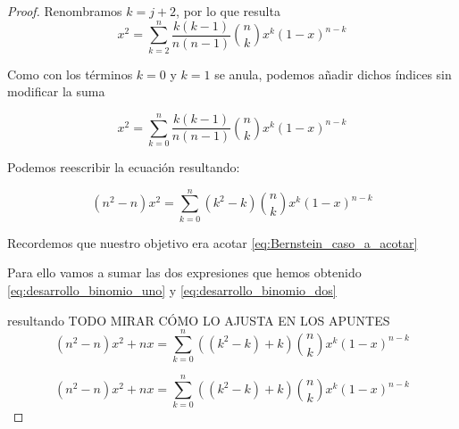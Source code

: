 \begin{proof}
    Renombramos $k= j+2$, por lo que resulta
    \begin{equation}
        x^2 = \sum_{k=2}^{n} \frac{k(k-1)}{n(n-1)} \binom{n}{k} x^{k} (1-x)^{n-k}
    \end{equation}

    Como con los términos $k=0$ y $k=1$ se anula, podemos añadir dichos índices sin modificar la suma 
    
    \begin{equation}
        x^2 = \sum_{k=0}^{n} \frac{k(k-1)}{n(n-1)} \binom{n}{k} x^{k} (1-x)^{n-k}
    \end{equation}

    Podemos reescribir la ecuación resultando: 

    \begin{equation} \label{eq:desarrollo_binomio_dos}
      (n^2 - n)  x^2 = \sum_{k=0}^{n} (k^2 - k) \binom{n}{k} x^{k} (1-x)^{n-k}
    \end{equation}
    
    

Recordemos que nuestro objetivo era acotar \ref{eq:Bernstein_caso_a_acotar}

Para ello vamos a sumar las dos expresiones que hemos obtenido
 \ref{eq:desarrollo_binomio_uno} y \ref{eq:desarrollo_binomio_dos}

 resultando 
 TODO MIRAR CÓMO LO AJUSTA EN LOS APUNTES
 \begin{equation} 
    (n^2 - n)  x^2 + nx= \sum_{k=0}^{n} ((k^2 - k)+k) \binom{n}{k} x^{k} (1-x)^{n-k}
  \end{equation}

  \begin{equation} 
    (n^2 - n)  x^2 + nx= \sum_{k=0}^{n} ((k^2 - k)+k) \binom{n}{k} x^{k} (1-x)^{n-k}
  \end{equation}


\end{proof}

 
 
\endinput 